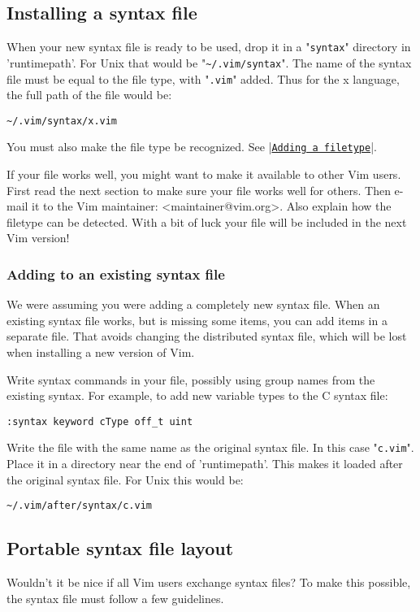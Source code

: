 \subsection{Installing a syntax file}
When your new syntax file is ready to be used, drop it in a "\verb!syntax!" directory in 'runtimepath'.
For Unix that would be "\verb!~/.vim/syntax!".
The name of the syntax file must be equal to the file type, with "\verb!.vim!" added.
Thus for the x language, the full path of the file would be:

\begin{Verbatim}[samepage=true]
    ~/.vim/syntax/x.vim 
\end{Verbatim}

You must also make the file type be recognized.
See |\hyperref[Adding a filetype]{\texttt{Adding a filetype}}|.

If your file works well, you might want to make it available to other Vim users.
First read the next section to make sure your file works well for others. Then e-mail it to the Vim maintainer: <maintainer@vim.org>. Also explain how the filetype can be detected.
With a bit of luck your file will be included in the next Vim version!

\subsubsection{Adding to an existing syntax file}
We were assuming you were adding a completely new syntax file.
When an existing syntax file works, but is missing some items, you can add items in a separate file.
That avoids changing the distributed syntax file, which will be lost when installing a new version of Vim.

Write syntax commands in your file, possibly using group names from the existing syntax.
For example, to add new variable types to the C syntax file:

\begin{Verbatim}[samepage=true]
 :syntax keyword cType off_t uint
\end{Verbatim}

Write the file with the same name as the original syntax file.
In this case "\verb!c.vim!".
Place it in a directory near the end of 'runtimepath'.
This makes it loaded after the original syntax file.
For Unix this would be:

\begin{Verbatim}[samepage=true]
    ~/.vim/after/syntax/c.vim 
\end{Verbatim}
\subsection{Portable syntax file layout}
Wouldn't it be nice if all Vim users exchange syntax files?  To make this possible, the syntax file must follow a few guidelines.

